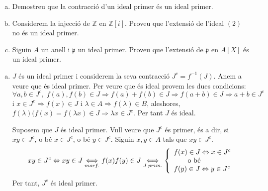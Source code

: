 \documentclass[../main.tex]{subfiles}
\begin{document}
\setcounter{exercici}{21}
\begin{exercici}
\begin{enumerate}[(a)]
    \item Demostreu que la contracció d'un ideal primer és un ideal primer.
    \item Considerem la injecció de $\mathbb{Z}$ en $\mathbb{Z}[i]$. Proveu que l'extensió de l'ideal $(2)$ no és un ideal primer.
    \item Siguin $A$ un anell i $\mathfrak{p}$ un ideal primer. Proveu que l'extensió de $\mathfrak{p}$ en $A[X]$ és un ideal primer.
\end{enumerate}
\end{exercici}
\begin{sol}
\begin{enumerate}[(a)]
    \item $J$ és un ideal primer i considerem la seva contracció $J^c=f^{-1}(J)$. Anem a veure que és ideal primer. Per veure que és ideal provem les dues condicions: $\forall a,b\in J^c,\;f(a),f(b)\in J\Rightarrow f(a)+f(b)\in J \Rightarrow f(a+b)\in J\Rightarrow a+b\in J^c$ i $x\in J^c\Rightarrow f(x)\in J$ i $\lambda\in A\Rightarrow f(\lambda)\in B$, aleshores, $f(\lambda)(f(x) = f(\lambda x)\in J\Rightarrow \lambda x\in J^c$. Per tant $J$ és ideal. 
    
    Suposem que $J$ és ideal primer. Vull veure que $J^c$ és primer, és a dir, si $xy\in J^c$, o bé $x\in J^c$, o bé $y\in J^c$. Siguin $x,y\in A$ tals que $xy\in J^c$.
        \begin{equation}
            \notag
            xy\in J^c\Leftrightarrow xy\in J\underset{morf.}{\Longleftrightarrow} f(x)f(y)\in J\underset{J\;prim.}{\Longleftrightarrow}\left\{
            \begin{array}{ll}
                f(x)\in J\Leftrightarrow x\in J^c\\
                \qquad \text{o bé}\\
                f(y)\in J\Leftrightarrow y\in J^c
            \end{array}
            \right.
        \end{equation}
        Per tant, $J^c$ és ideal primer.
    

\end{enumerate}
\end{sol}
\end{document}
